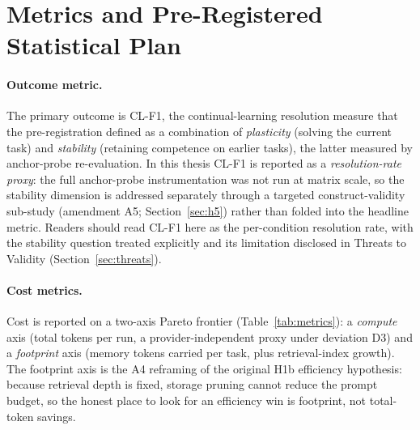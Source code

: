 

\section{Metrics and Pre-Registered Statistical Plan}
\label{sec:metrics}

\paragraph{Outcome metric.}
The primary outcome is CL-F1, the continual-learning resolution measure that the
pre-registration defined as a combination of \emph{plasticity} (solving the current task)
and \emph{stability} (retaining competence on earlier tasks), the latter measured by
anchor-probe re-evaluation. In this thesis CL-F1 is reported as a \emph{resolution-rate
proxy}: the full anchor-probe instrumentation was not run at matrix scale, so the stability
dimension is addressed separately through a targeted construct-validity sub-study
(amendment A5; Section~\ref{sec:h5}) rather than folded into the headline metric. Readers
should read CL-F1 here as the per-condition resolution rate, with the stability question
treated explicitly and its limitation disclosed in Threats to Validity
(Section~\ref{sec:threats}).

\paragraph{Cost metrics.}
Cost is reported on a two-axis Pareto frontier (Table~\ref{tab:metrics}): a \emph{compute}
axis (total tokens per run, a provider-independent proxy under deviation D3) and a
\emph{footprint} axis (memory tokens carried per task, plus retrieval-index growth). The
footprint axis is the A4 reframing of the original H1b efficiency hypothesis: because
retrieval depth is fixed, storage pruning cannot reduce the prompt budget, so the honest
place to look for an efficiency win is footprint, not total-token savings.

